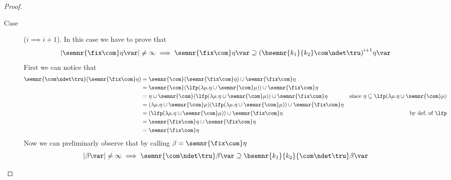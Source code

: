 \begin{proof}
\begin{inductive}
\begin{description}
    \item[Case] (\(i \implies i+1\)). In this case we have to prove
      that
      \begin{equation*}
        |\semnr{\fix\com}\eta\var| \neq \infty \implies \semnr{\fix\com}\eta\var \supseteq {\left(\bsemnr{k_1}{k_2}\com\ndet\tru\right)}^{i+1}\eta\var
      \end{equation*}
      First we can notice that
      \begin{align*}
        \semnr{\com\ndet\tru}(\semnr{\fix\com}\eta) & = \semnr{\com}(\semnr{\fix\com}\eta) \cup \semnr{\fix\com}\eta \\
                                                    & = \semnr{\com}(\lfp(\lambda \mu . \eta \cup \semnr{\com}\mu)) \cup \semnr{\fix\com}\eta \\
                                                    & = \eta \cup \semnr{\com}(\lfp(\lambda \mu . \eta \cup \semnr{\com}\mu)) \cup \semnr{\fix\com}\eta & \text{since } \eta \subseteq \lfp(\lambda \mu . \eta \cup \semnr{\com}\mu)\\
                                                    & = (\lambda \mu . \eta \cup \semnr{\com}\mu)(\lfp(\lambda \mu . \eta \cup \semnr{\com}\mu)) \cup \semnr{\fix\com}\eta \\
                                                    & = (\lfp(\lambda \mu . \eta \cup \semnr{\com}\mu)) \cup \semnr{\fix\com}\eta & \text{by def.\ of } \lfp\\
                                                    & = \semnr{\fix\com}\eta \cup \semnr{\fix\com}\eta \\
                                                    & = \semnr{\fix\com}\eta
      \end{align*}
      Now we can preliminarly observe that by calling
      \(\beta = \semnr{\fix\com}\eta\)
      \begin{equation}\label{eq:comfixbound}
        |\beta\var| \neq\infty \implies \semnr{\com\ndet\tru}\beta\var \supseteq \bsemnr{k_1}{k_2}{\com\ndet\tru}\beta\var

\end{equation}
\end{description}
\end{inductive}
\end{proof}

